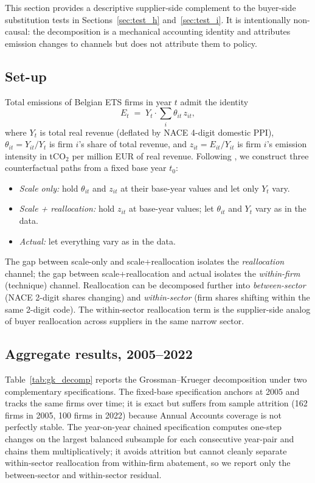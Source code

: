 This section provides a descriptive supplier-side complement to the buyer-side substitution tests in Sections~\ref{sec:test_h} and~\ref{sec:test_i}. It is intentionally non-causal: the decomposition is a mechanical accounting identity and attributes emission changes to channels but does not attribute them to policy.

\subsection{Set-up}

Total emissions of Belgian ETS firms in year $t$ admit the identity
\begin{equation}
    E_t \;=\; Y_t \cdot \sum_{i} \theta_{it}\,z_{it},
    \label{eq:identity}
\end{equation}
where $Y_t$ is total real revenue (deflated by NACE 4-digit domestic PPI), $\theta_{it} = Y_{it}/Y_t$ is firm $i$'s share of total revenue, and $z_{it} = E_{it}/Y_{it}$ is firm $i$'s emission intensity in tCO$_2$ per million EUR of real revenue. Following \citet{grossman1993}, we construct three counterfactual paths from a fixed base year $t_0$:
\begin{itemize}
    \item \emph{Scale only:} hold $\theta_{it}$ and $z_{it}$ at their base-year values and let only $Y_t$ vary.
    \item \emph{Scale + reallocation:} hold $z_{it}$ at base-year values; let $\theta_{it}$ and $Y_t$ vary as in the data.
    \item \emph{Actual:} let everything vary as in the data.
\end{itemize}
The gap between scale-only and scale+reallocation isolates the \emph{reallocation} channel; the gap between scale+reallocation and actual isolates the \emph{within-firm} (technique) channel. Reallocation can be decomposed further into \emph{between-sector} (NACE 2-digit shares changing) and \emph{within-sector} (firm shares shifting within the same 2-digit code). The within-sector reallocation term is the supplier-side analog of buyer reallocation across suppliers in the same narrow sector.

\subsection{Aggregate results, 2005--2022}

Table~\ref{tab:gk_decomp} reports the Grossman--Krueger decomposition under two complementary specifications. The fixed-base specification anchors at 2005 and tracks the same firms over time; it is exact but suffers from sample attrition (162 firms in 2005, 100 firms in 2022) because Annual Accounts coverage is not perfectly stable. The year-on-year chained specification computes one-step changes on the largest balanced subsample for each consecutive year-pair and chains them multiplicatively; it avoids attrition but cannot cleanly separate within-sector reallocation from within-firm abatement, so we report only the between-sector and within-sector residual.

